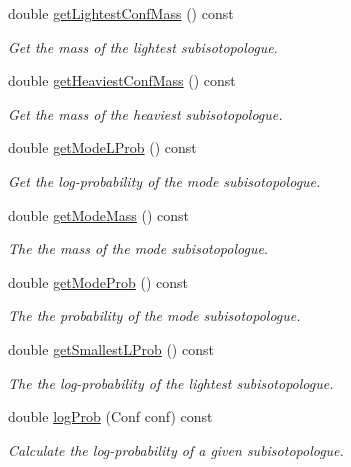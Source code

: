\begin{DoxyCompactItemize}
double \mbox{\hyperlink{class_iso_spec_1_1_marginal_a8b67c507263973da53e533d804e23ac9}{get\+Lightest\+Conf\+Mass}} () const
\begin{DoxyCompactList}\small\item\em Get the mass of the lightest subisotopologue. \end{DoxyCompactList}\item 
double \mbox{\hyperlink{class_iso_spec_1_1_marginal_aa5598b4d2b31b5daec1c2bac653d0aff}{get\+Heaviest\+Conf\+Mass}} () const
\begin{DoxyCompactList}\small\item\em Get the mass of the heaviest subisotopologue. \end{DoxyCompactList}\item 
double \mbox{\hyperlink{class_iso_spec_1_1_marginal_ac9408957145d2aa63af32f6647c8ea49}{get\+Mode\+L\+Prob}} () const
\begin{DoxyCompactList}\small\item\em Get the log-\/probability of the mode subisotopologue. \end{DoxyCompactList}\item 
double \mbox{\hyperlink{class_iso_spec_1_1_marginal_ad2121802133075a87f0987dc27d0617f}{get\+Mode\+Mass}} () const
\begin{DoxyCompactList}\small\item\em The the mass of the mode subisotopologue. \end{DoxyCompactList}\item 
double \mbox{\hyperlink{class_iso_spec_1_1_marginal_a7bc1eeba342977de3a77c3c7e6ca55b0}{get\+Mode\+Prob}} () const
\begin{DoxyCompactList}\small\item\em The the probability of the mode subisotopologue. \end{DoxyCompactList}\item 
double \mbox{\hyperlink{class_iso_spec_1_1_marginal_a3f9607f51efcfdac1ca58a1467e3a5dc}{get\+Smallest\+L\+Prob}} () const
\begin{DoxyCompactList}\small\item\em The the log-\/probability of the lightest subisotopologue. \end{DoxyCompactList}\item 
double \mbox{\hyperlink{class_iso_spec_1_1_marginal_a1974bb030ce70178da569214b4b93cb8}{log\+Prob}} (Conf conf) const
\begin{DoxyCompactList}\small\item\em Calculate the log-\/probability of a given subisotopologue. \end{DoxyCompactList}\end{DoxyCompactItemize}
